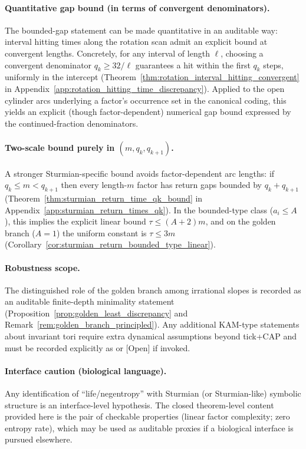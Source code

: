 \paragraph{Quantitative gap bound (in terms of convergent denominators).}
\MathTag The bounded-gap statement can be made quantitative in an auditable way:
interval hitting times along the rotation scan admit an explicit bound at convergent lengths.
Concretely, for any interval of length $\ell$, choosing a convergent denominator $q_k\ge 32/\ell$ guarantees a hit within the first $q_k$ steps, uniformly in the intercept (Theorem~\ref{thm:rotation_interval_hitting_convergent} in Appendix~\ref{app:rotation_hitting_time_discrepancy}).
Applied to the open cylinder arcs underlying a factor's occurrence set in the canonical coding, this yields an explicit (though factor-dependent) numerical gap bound expressed by the continued-fraction denominators.

\paragraph{Two-scale bound purely in \texorpdfstring{$(m,q_k,q_{k+1})$}{(m,qk,qk+1)}.}
\MathTag A stronger Sturmian-specific bound avoids factor-dependent arc lengths:
if $q_k\le m<q_{k+1}$ then every length-$m$ factor has return gaps bounded by $q_k+q_{k+1}$ (Theorem~\ref{thm:sturmian_return_time_qk_bound} in Appendix~\ref{app:sturmian_return_times_qk}).
In the bounded-type class ($a_i\le A$), this implies the explicit linear bound $\tau\le (A+2)m$, and on the golden branch ($A=1$) the uniform constant is $\tau\le 3m$ (Corollary~\ref{cor:sturmian_return_bounded_type_linear}).

\paragraph{Robustness scope.}
\MathTag The distinguished role of the golden branch among irrational slopes is recorded as an auditable finite-depth minimality statement (Proposition~\ref{prop:golden_least_discrepancy} and Remark~\ref{rem:golden_branch_principled}).
Any additional KAM-type statements about invariant tori require extra dynamical assumptions beyond tick+CAP and must be recorded explicitly as \AuditTag or \textsf{[Open]} if invoked.

\paragraph{Interface caution (biological language).}
\InterfaceTag Any identification of ``life/negentropy'' with Sturmian (or Sturmian-like) symbolic structure is an interface-level hypothesis.
The closed theorem-level content provided here is the pair of checkable properties (linear factor complexity; zero entropy rate), which may be used as auditable proxies if a biological interface is pursued elsewhere.

